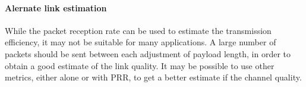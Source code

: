 \paragraph{Alernate link estimation} While the packet reception rate can be used to estimate the transmission efficiency, it may not be suitable for many applications. A large number of packets should be sent between each adjustment of payload length, in order to obtain a good estimate of the link quality. It may be possible to use other metrics, either alone or with PRR, to get a better estimate if the channel quality. 
